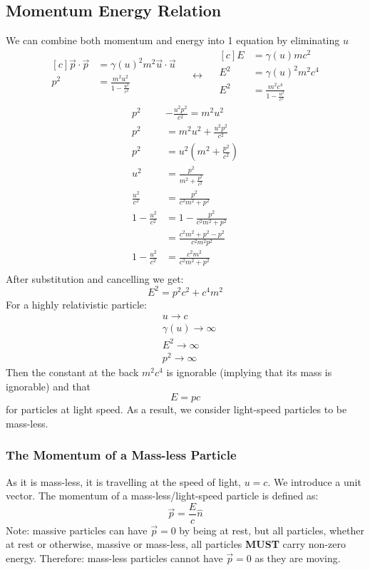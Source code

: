 \documentclass[10pt]{report}
\begin{document}
{\subsection{Momentum Energy Relation}
\par{We can combine both momentum and energy into 1 equation by eliminating $u$}
\begin{equation*}
	\begin{aligned}[c]
		\vec{p}\cdot\vec{p}&=\gamma\left(u\right)^{2}m^{2}\vec{u}\cdot\vec{u} \\
		p^{2}&=\frac{m^{2}u^{2}}{1-\frac{u^{2}}{c^{2}}}
	\end{aligned}
	\quad\leftrightarrow\quad
	\begin{aligned}[c]
		E&=\gamma\left(u\right)mc^{2} \\
		E^{2}&=\gamma\left(u\right)^{2}m^{2}c^{4} \\
		E^{2}&=\frac{m^{2}c^{4}}{1-\frac{u^{2}}{c^{2}}}
	\end{aligned}
\end{equation*}
\begin{align*}
	p^{2}&-\frac{u^{2}p^{2}}{c^{2}}=m^{2}u^{2} \\
	p^{2}&=m^{2}u^{2}+\frac{u^{2}p^{2}}{c^{2}} \\
	p^{2}&=u^{2}\left(m^{2}+\frac{p^{2}}{c^{2}}\right) \\
	u^{2}&=\frac{p^{2}}{m^{2}+\frac{p^{2}}{c^{2}}} \\ 
	\frac{u^{2}}{c^{2}}&=\frac{p^{2}}{c^{2}m^{2}+p^{2}} \\
	1-\frac{u^{2}}{c^{2}}&=1-\frac{p^{2}}{c^{2}m^{2}+p^{2}} \\
	&=\frac{c^{2}m^{2}+p^{2}-p^{2}}{c^{2}m^{2}p^{2}} \\
	1-\frac{u^{2}}{c^{2}}&=\frac{c^{2}m^{2}}{c^{2}m^{2}+p^{2}} \\
\end{align*}
After substitution and cancelling we get:
\[
E^{2}=p^{2}c^{2}+c^{4}m^{2}
\] 
For a highly relativistic particle:
\begin{align*}
	&u\to c \\
	&\gamma\left(u\right)\to\infty \\
	&E^{2}\to\infty \\
	&p^{2}\to\infty
\end{align*}
Then the constant at the back $m^{2}c^{4}$ is ignorable (implying that its mass is ignorable) and that \[
E=pc
\]  for particles at light speed. As a result, we consider light-speed particles to be mass-less. 
\subsubsection{The Momentum of a Mass-less Particle}
\par{As it is mass-less, it is travelling at the speed of light, $u=c$. We introduce a unit vector. The momentum of a mass-less/light-speed particle is defined as:}
\[
	\vec{p}=\frac{E}{c}\hat{n}
\] 
Note: massive particles can have $\vec{p}=0$ by being at rest, but all particles, whether at rest or otherwise, massive or mass-less, all particles \textbf{MUST} carry non-zero energy. Therefore: mass-less particles cannot have $\vec{p}=0$ as they are moving.

}
\end{document}
